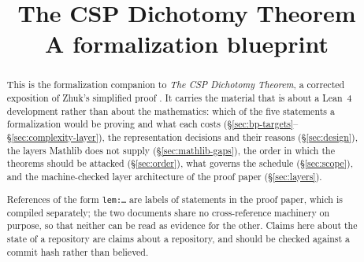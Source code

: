\documentclass[11pt]{article}
\title{The CSP Dichotomy Theorem\\[2pt]
  \large A formalization blueprint}
\author{}\date{}
\begin{document}
\maketitle\vspace{-2.2em}
\begin{abstract}
This is the formalization companion to \emph{The CSP Dichotomy Theorem}, a
corrected exposition of Zhuk's simplified proof \cite{ZhukSimplified}. It
carries the material that is about a Lean~4 development rather than about the
mathematics: which of the five statements a formalization would be proving and
what each costs (\S\ref{sec:bp-targets}--\S\ref{sec:complexity-layer}), the
representation decisions and their reasons (\S\ref{sec:design}), the layers
Mathlib does not supply (\S\ref{sec:mathlib-gaps}), the order in which the
theorems should be attacked (\S\ref{sec:order}), what governs the schedule
(\S\ref{sec:scope}), and the machine-checked layer architecture of the proof
paper (\S\ref{sec:layers}).

References of the form \texttt{lem:\dots} are labels of statements in the proof
paper, which is compiled separately; the two documents share no cross-reference
machinery on purpose, so that neither can be read as evidence for the other.
Claims here about the state of a repository are claims about a repository, and
should be checked against a commit hash rather than believed.
\end{abstract}

\tableofcontents\clearpage


\clearpage

\clearpage


\clearpage

\end{document}
